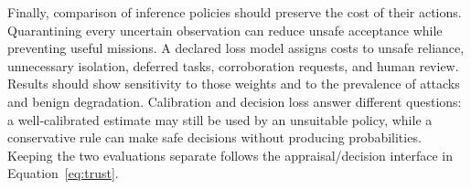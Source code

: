 Finally, comparison of inference policies should preserve the cost of their actions. Quarantining every uncertain observation can reduce unsafe acceptance while preventing useful missions. A declared loss model assigns costs to unsafe reliance, unnecessary isolation, deferred tasks, corroboration requests, and human review. Results should show sensitivity to those weights and to the prevalence of attacks and benign degradation. Calibration and decision loss answer different questions: a well-calibrated estimate may still be used by an unsuitable policy, while a conservative rule can make safe decisions without producing probabilities. Keeping the two evaluations separate follows the appraisal/decision interface in Equation~\eqref{eq:trust}.
